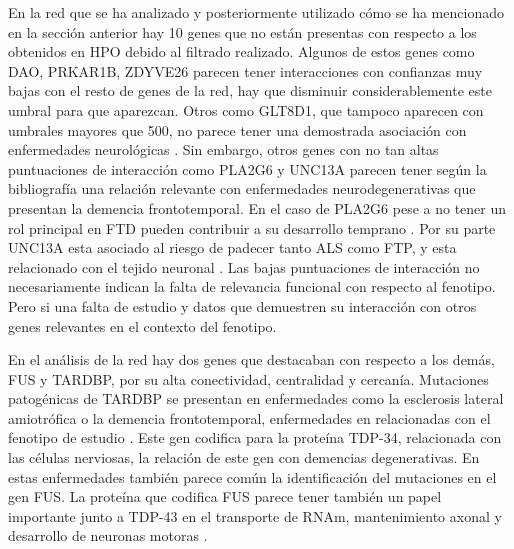 En la red que se ha analizado y posteriormente utilizado cómo se ha mencionado en la sección anterior hay 10 genes que no están presentas con respecto a los obtenidos en HPO debido al filtrado realizado.
Algunos de estos genes como DAO, PRKAR1B, ZDYVE26 parecen tener interacciones con confianzas muy bajas con el resto de genes de la red, hay que disminuir considerablemente este umbral para que aparezcan. 
Otros como GLT8D1, que tampoco aparecen con umbrales mayores que 500, no parece tener una demostrada asociación con enfermedades neurológicas \cite{Yilihamu2021}.
Sin embargo, otros genes con no tan altas puntuaciones de interacción como PLA2G6 y UNC13A parecen tener según la bibliografía una relación relevante con enfermedades neurodegenerativas que presentan la demencia frontotemporal. En el caso de PLA2G6  pese a no tener un rol principal en FTD pueden contribuir a su desarrollo temprano \cite{Tomiyama2011}. 
Por su parte UNC13A esta asociado al riesgo de padecer tanto ALS como FTP, y esta relacionado con el tejido neuronal \cite{Diekstra2012}.
Las bajas puntuaciones de interacción no necesariamente indican la falta de relevancia funcional con respecto al fenotipo. Pero si una falta de estudio y datos que demuestren su interacción con otros genes relevantes en el contexto del fenotipo.


En el análisis de la red hay dos genes que destacaban con respecto a los demás, FUS y TARDBP, por su alta conectividad, centralidad y cercanía.
 Mutaciones patogénicas de TARDBP se presentan en enfermedades como la esclerosis lateral amiotrófica o la demencia frontotemporal, enfermedades en relacionadas con el fenotipo de estudio \cite{Monohar2009}.
 Este gen codifica para la proteína TDP-34, relacionada con las células nerviosas, la relación de este gen con demencias degenerativas.\cite{Ure2021}
 En estas enfermedades también parece común la identificación del mutaciones en el gen FUS.
La proteína que codifica FUS parece tener también un papel importante junto a TDP-43 en el transporte de RNAm, mantenimiento axonal y desarrollo de neuronas motoras  \cite{Lattante2013}.






